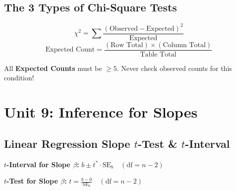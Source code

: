 \documentclass[11pt,oneside,openany]{book}
\begin{document}
\section{The 3 Types of Chi-Square Tests}
\begin{table}[H]
\centering
{}
\end{table}

\begin{formulabox}
$$\chi^2 = \sum \frac{(\text{Observed} - \text{Expected})^2}{\text{Expected}}$$
$$\text{Expected Count} = \frac{(\text{Row Total}) \times (\text{Column Total})}{\text{Table Total}}$$
\end{formulabox}

\begin{trapbox}
All \textbf{Expected Counts} must be $\ge 5$. Never check observed counts for this condition!
\end{trapbox}

\chapter{Unit 9: Inference for Slopes}

\section{Linear Regression Slope $t$-Test \& $t$-Interval}
\begin{formulabox}
\textbf{$t$-Interval for Slope $\beta$:} $b \pm t^* \cdot \text{SE}_b \quad (\text{df} = n - 2)$

\textbf{$t$-Test for Slope $\beta$:} $t = \frac{b - 0}{\text{SE}_b} \quad (\text{df} = n - 2)$
\end{formulabox}
\end{document}
